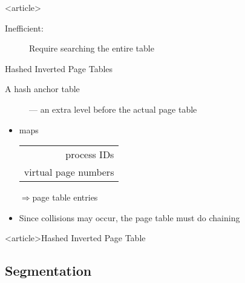 \begin{frame}<article>
  \begin{description}
  \item[Inefficient:] Require searching the entire table 
  \end{description}
  \begin{center}
  \end{center}
\end{frame}

\begin{frame}{Hashed Inverted Page Tables}
  \begin{description}
  \item[A hash anchor table] --- an extra level before the actual page table 
  \end{description}
  \begin{itemize}
  \item maps
    \begin{scriptsize}
      \begin{tabular}{r}
        process IDs\\
        virtual page numbers
      \end{tabular}
    \end{scriptsize}
    $\Rightarrow{}$page table entries
  \item Since collisions may occur, the page table must do chaining
  \end{itemize}
  \centering
\end{frame}

\begin{frame}<article>{Hashed Inverted Page Table}
  \begin{center}
  \end{center}
\end{frame}

\subsection{Segmentation}

